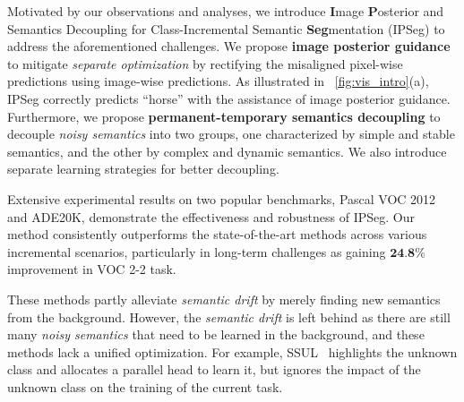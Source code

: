 Motivated by our observations and analyses, we introduce \textbf{I}mage \textbf{P}osterior and Semantics Decoupling for Class-Incremental Semantic \textbf{Seg}mentation (IPSeg) to address the aforementioned challenges.
We propose \textbf{image posterior guidance} to mitigate \textit{separate optimization} by rectifying the misaligned pixel-wise predictions using image-wise predictions.
As illustrated in ~\cref{fig:vis_intro}(a), IPSeg correctly predicts ``horse'' with the assistance of image posterior guidance.
Furthermore, we propose \textbf{permanent-temporary semantics decoupling} to decouple \textit{noisy semantics} into two groups, one characterized by simple and stable semantics, and the other by complex and dynamic semantics. We also introduce separate learning strategies for better decoupling.



Extensive experimental results on two popular benchmarks, Pascal VOC 2012 and ADE20K, demonstrate the effectiveness and robustness of IPSeg. Our method consistently outperforms the state-of-the-art methods across various incremental scenarios, particularly in long-term challenges as gaining \(\textbf{24.8}\)\% improvement in VOC 2-2 task. 

\iffalse
MiB~\citep{MiB_cermelli2020modeling} and PLOP~\citep{PLOP_douillard2021plop} pioneer this investigation using knowledge distillation and pseudo-labeling techniques. %
SSUL~\citep{SSUL_cha2021ssul} further filters the unknown class from the background region with salient maps.
MicroSeg~\citep{microseg_zhang2022mining} and CoinSeg~\citep{coinseg_zhang2023coinseg} propose to use segment proposals to distinguish the foreground region from the background. 
\fi

\iffalse
These methods partly alleviate \textit{semantic drift} by merely finding new semantics from the background. However, the \textit{semantic drift} is left behind as there are still many \textit{noisy semantics} that need to be learned in the background, and these methods lack a unified optimization. For example, SSUL~\citep{SSUL_cha2021ssul} highlights the unknown class and allocates a parallel head to learn it, but ignores the impact of the unknown class on the training of the current task.

